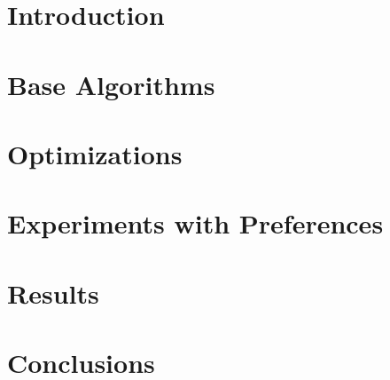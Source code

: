 \chapter{Introduction}




\chapter{Base Algorithms}





\chapter{Optimizations}




\chapter{Experiments with Preferences}


\chapter{Results}
\label{chap:results}



\chapter{Conclusions}
